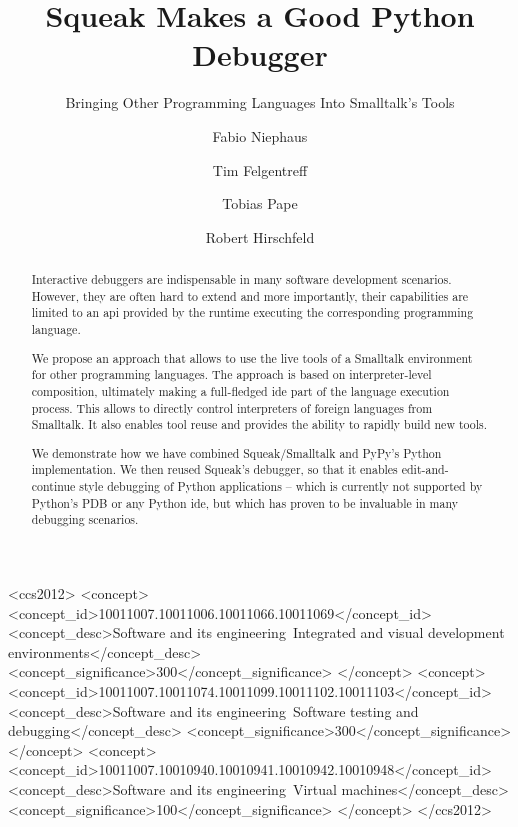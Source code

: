 \documentclass[sigconf,english]{acmart}
\newcommand{\ac}[1]{\gls*{#1}}
\newcommand*\Squeak{Squeak\slash Smalltalk\xspace}
\begin{document}
\title{Squeak Makes a Good Python Debugger}
\subtitle{Bringing Other Programming Languages Into Smalltalk's Tools}


\author{Fabio Niephaus}

\author{Tim Felgentreff}

\author{Tobias Pape}

\author{Robert Hirschfeld}


\begin{abstract}

Interactive debuggers are indispensable in many software development scenarios.
However, they are often hard to extend and more importantly, their capabilities
are limited to an \ac{api} provided by the runtime executing the
corresponding programming language.

We propose an approach that allows to use the live tools of a Smalltalk
environment for other programming languages.
The approach is based on interpreter-level composition, ultimately making a
full-fledged \ac{ide} part of the language execution process.
This allows to directly control interpreters of foreign languages from
Smalltalk.
It also enables tool reuse and provides the ability to rapidly build new tools.

We demonstrate how we have combined \Squeak and PyPy's Python
implementation.
We then reused Squeak's debugger, so that it enables edit-and-continue style
debugging of Python applications \--- which is currently not supported
by Python's PDB or any Python \ac{ide}, but which has proven to be invaluable
in many debugging scenarios.

\end{abstract}

%
%
\begin{CCSXML}
<ccs2012>
<concept>
<concept_id>10011007.10011006.10011066.10011069</concept_id>
<concept_desc>Software and its engineering~Integrated and visual development environments</concept_desc>
<concept_significance>300</concept_significance>
</concept>
<concept>
<concept_id>10011007.10011074.10011099.10011102.10011103</concept_id>
<concept_desc>Software and its engineering~Software testing and debugging</concept_desc>
<concept_significance>300</concept_significance>
</concept>
<concept>
<concept_id>10011007.10010940.10010941.10010942.10010948</concept_id>
<concept_desc>Software and its engineering~Virtual machines</concept_desc>
<concept_significance>100</concept_significance>
</concept>
</ccs2012>
\end{CCSXML}
\end{document}
